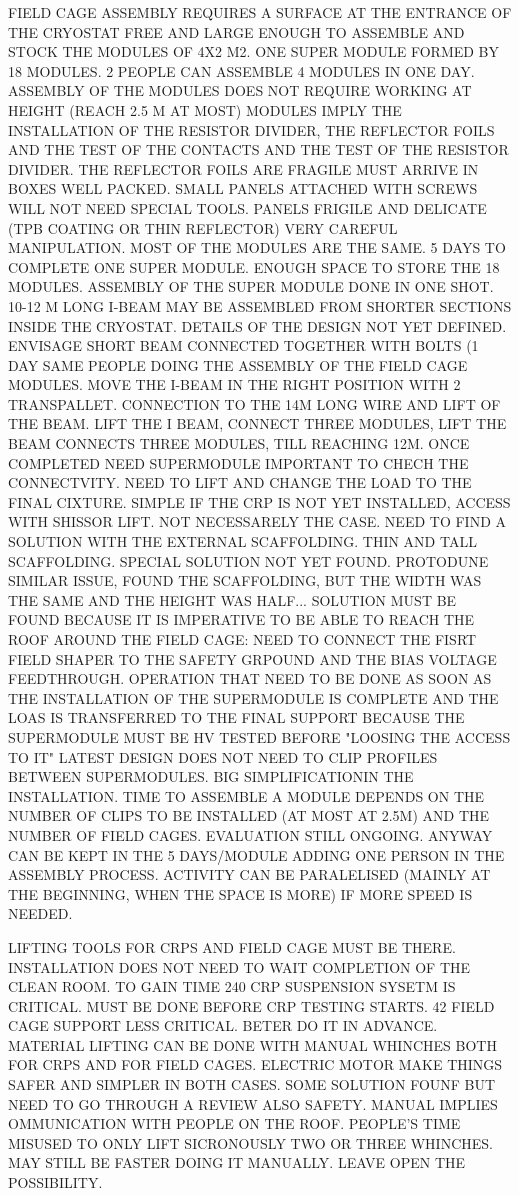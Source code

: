 FIELD CAGE ASSEMBLY REQUIRES A SURFACE AT THE ENTRANCE OF THE CRYOSTAT FREE AND LARGE ENOUGH TO ASSEMBLE AND STOCK THE MODULES OF 4X2 M2.
ONE SUPER MODULE FORMED BY 18 MODULES.
2 PEOPLE CAN ASSEMBLE 4 MODULES IN ONE DAY.
ASSEMBLY OF THE MODULES DOES NOT REQUIRE WORKING AT HEIGHT (REACH 2.5 M AT MOST)
MODULES IMPLY THE INSTALLATION OF THE RESISTOR DIVIDER, THE REFLECTOR FOILS AND THE TEST OF THE CONTACTS AND THE TEST OF THE RESISTOR DIVIDER.
THE REFLECTOR FOILS ARE FRAGILE MUST ARRIVE IN BOXES WELL PACKED.
SMALL PANELS ATTACHED WITH SCREWS WILL NOT NEED SPECIAL TOOLS.
PANELS FRIGILE AND DELICATE (TPB COATING OR THIN REFLECTOR) VERY CAREFUL MANIPULATION.
MOST OF THE MODULES ARE THE SAME.
5 DAYS TO COMPLETE ONE SUPER MODULE.
ENOUGH SPACE TO STORE THE 18 MODULES.
ASSEMBLY OF THE SUPER MODULE DONE IN ONE SHOT.
10-12 M LONG I-BEAM MAY BE ASSEMBLED FROM SHORTER SECTIONS INSIDE THE CRYOSTAT.
DETAILS OF THE DESIGN NOT YET DEFINED.
ENVISAGE SHORT BEAM CONNECTED TOGETHER WITH BOLTS (1 DAY SAME PEOPLE DOING THE ASSEMBLY OF THE FIELD CAGE MODULES.
MOVE THE I-BEAM IN THE RIGHT POSITION WITH 2 TRANSPALLET.
CONNECTION TO THE 14M LONG WIRE AND LIFT OF THE BEAM.
LIFT THE I BEAM, CONNECT THREE MODULES, LIFT THE BEAM CONNECTS THREE MODULES, TILL REACHING 12M.
ONCE COMPLETED NEED SUPERMODULE IMPORTANT TO CHECH THE CONNECTVITY.
NEED TO LIFT AND CHANGE THE LOAD TO THE FINAL CIXTURE.
SIMPLE IF THE CRP IS NOT YET INSTALLED, ACCESS WITH SHISSOR LIFT.
NOT NECESSARELY THE CASE. NEED TO FIND A SOLUTION WITH THE EXTERNAL SCAFFOLDING.
THIN AND TALL SCAFFOLDING.
SPECIAL SOLUTION NOT YET FOUND.
PROTODUNE SIMILAR ISSUE, FOUND THE SCAFFOLDING, BUT THE WIDTH WAS THE SAME AND THE HEIGHT WAS HALF...
SOLUTION MUST BE FOUND BECAUSE IT IS IMPERATIVE TO BE ABLE TO REACH THE ROOF AROUND THE FIELD CAGE:
NEED TO CONNECT THE FISRT FIELD SHAPER TO THE SAFETY GRPOUND AND THE BIAS VOLTAGE FEEDTHROUGH.
OPERATION THAT NEED TO BE DONE AS SOON AS THE  INSTALLATION OF THE SUPERMODULE IS COMPLETE AND THE LOAS IS TRANSFERRED TO THE FINAL SUPPORT BECAUSE THE SUPERMODULE MUST BE HV TESTED BEFORE "LOOSING THE ACCESS TO IT" 
LATEST DESIGN DOES NOT NEED TO CLIP PROFILES BETWEEN SUPERMODULES.
BIG SIMPLIFICATIONIN THE INSTALLATION.
TIME TO ASSEMBLE A MODULE DEPENDS ON THE NUMBER OF CLIPS  TO BE INSTALLED (AT MOST AT 2.5M) AND THE NUMBER OF FIELD CAGES.
EVALUATION STILL ONGOING. ANYWAY CAN BE KEPT IN THE 5 DAYS/MODULE ADDING ONE PERSON IN THE ASSEMBLY PROCESS.
ACTIVITY CAN BE PARALELISED (MAINLY AT THE BEGINNING, WHEN THE SPACE IS MORE) IF MORE SPEED IS NEEDED.

LIFTING TOOLS FOR CRPS AND FIELD CAGE MUST BE THERE.
INSTALLATION DOES NOT NEED TO WAIT COMPLETION OF THE CLEAN ROOM.
TO GAIN TIME 240 CRP SUSPENSION SYSETM IS CRITICAL. MUST BE DONE BEFORE CRP TESTING STARTS.
42 FIELD CAGE SUPPORT LESS CRITICAL. BETER DO IT IN ADVANCE.
MATERIAL LIFTING CAN BE DONE WITH MANUAL WHINCHES BOTH FOR CRPS AND FOR FIELD CAGES.
ELECTRIC MOTOR MAKE THINGS SAFER AND SIMPLER IN BOTH CASES.
SOME SOLUTION FOUNF BUT NEED TO GO THROUGH A REVIEW ALSO SAFETY.
MANUAL IMPLIES OMMUNICATION WITH PEOPLE ON THE ROOF.
PEOPLE'S TIME MISUSED TO ONLY LIFT SICRONOUSLY TWO OR THREE WHINCHES.
MAY STILL BE FASTER DOING IT MANUALLY.
LEAVE OPEN THE POSSIBILITY.

